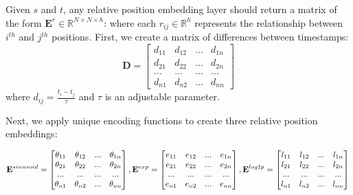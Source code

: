 Given $s$ and $t$, any relative position embedding layer should return a matrix of the form $\mathbf{E}^r \in \mathbb{R}^{N \times N \times h}$: where each $r_{ij} \in \mathbb{R}^h$ represents the relationship between $i^{th}$ and $j^{th}$ positions. First, we create a matrix of differences between timestamps:
\begin{displaymath}
  \mathbf{D} = \begin{bmatrix}
                    d_{11} & d_{12} & ... & d_{1n}\\
                    d_{21} & d_{22} & ... & d_{2n}\\
                    ... & ... & ... & ...\\
                    d_{n1} & d_{n2} & ... & d_{nn}
                    \end{bmatrix}
\end{displaymath}
where $d_{ij} = \frac{t_i - t_j}{\tau}$ and $\tau$ is an adjustable parameter.

Next, we apply unique encoding functions to create three relative position embeddings:

\begin{displaymath}
\mathbf{E}^{sinusoid} = \begin{bmatrix}
                    \theta_{11} & \theta_{12} & ... & \theta_{1n}\\
                    \theta_{21} & \theta_{22} & ... & \theta_{2n}\\
                    ... & ... & ... & ...\\
                    \theta_{n1} & \theta_{n2} & ... & \theta_{nn}
                    \end{bmatrix}\\
 ,\mathbf{E}^{exp} = \begin{bmatrix}
                    e_{11} & e_{12} & ... & e_{1n}\\
                    e_{21} & e_{22} & ... & e_{2n}\\
                    ... & ... & ... & ...\\
                    e_{n1} & e_{n2} & ... & e_{nn}
                    \end{bmatrix}\\
  , \mathbf{E}^{log1p} = \begin{bmatrix}
                        l_{11} & l_{12} & ... & l_{1n}\\
                        l_{21} & l_{22} & ... & l_{2n}\\
                        ... & ... & ... & ...\\
                        l_{n1} & l_{n2} & ... & l_{nn}
                        \end{bmatrix}\\
\end{displaymath}

